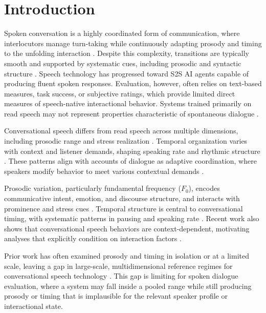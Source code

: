 \documentclass[conference]{IEEEtran}
\begin{document}
\section{Introduction}

Spoken conversation is a highly coordinated form of communication, where interlocutors manage turn-taking while continuously adapting prosody and timing to the unfolding interaction \cite{riest_anticipation_2015, levinson_turn-taking_2016}. 
Despite this complexity, transitions are typically smooth and supported by systematic cues, including prosodic and syntactic structure \cite{koiso_analysis_1998}.
Speech technology has progressed toward S2S AI agents capable of producing fluent spoken responses. 
Evaluation, however, often relies on text-based measures, task success, or subjective ratings, which provide limited direct measures of speech-native interactional behavior. 
Systems trained primarily on read speech may not represent properties characteristic of spontaneous dialogue \cite{omahony_combining_2022}.

Conversational speech differs from read speech across multiple dimensions, including prosodic range and stress realization \cite{howell1991comparison, hazan2010does}. 
Temporal organization varies with context and listener demands, shaping speaking rate and rhythmic structure \cite{tauroza_speech_1990, ward_automatic_2004, dowding_user_2024, xie_speaking_2024}. 
These patterns align with accounts of dialogue as adaptive coordination, where speakers modify behavior to meet various contextual demands \cite{fusaroli_dialog_2014, wynn_conversational_2024}.

Prosodic variation, particularly fundamental frequency ($F_0$), encodes communicative intent, emotion, and discourse structure, and interacts with prominence and stress cues \cite{banziger_role_2005, pell_emotional_2011, xu_speech_2005, sluijter_acoustic_1996, sluijter_spectral_1996}. 
Temporal structure is central to conversational timing, with systematic patterns in pausing and speaking rate \cite{goldman1958speech, pellegrino_automatic_2004, pellegrino_across-language_2011, jiao_estimating_2015, morgan_combining_1998, nanjo_language_2004}. 
Recent work also shows that conversational speech behaviors are context-dependent, motivating analyses that explicitly condition on interaction factors \cite{wynn_conversational_2024}.

Prior work has often examined prosody and timing in isolation or at a limited scale, leaving a gap in large-scale, multidimensional reference regimes for conversational speech technology \cite{traunmuller_acoustic_2000}. 
This gap is limiting for spoken dialogue evaluation, where a system may fall inside a pooled range while still producing prosody or timing that is implausible for the relevant speaker profile or interactional state.
\end{document}
